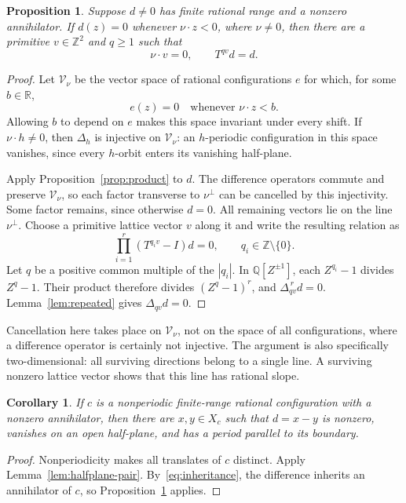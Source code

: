 \documentclass[11pt,a4paper,reqno]{amsart}
\newtheorem{proposition}[theorem]{Proposition}
\newtheorem{corollary}[theorem]{Corollary}
\theoremstyle{remark}
\newcommand{\Z}{\mathbb Z}
\newcommand{\Q}{\mathbb Q}
\newcommand{\R}{\mathbb R}
\newcommand{\De}{\Delta}
\numberwithin{equation}{section}
\begin{document}
\begin{proposition}\label{prop:tangent-period}
Suppose $d\ne0$ has finite rational range and a nonzero annihilator. If $d(z)=0$ whenever $\nu\cdot z<0$, where $\nu\ne0$, then there are a primitive $v\in\Z^2$ and $q\ge1$ such that
\[
 \nu\cdot v=0,\qquad T^{qv}d=d.
\]
\end{proposition}
\begin{proof}
Let $\mathcal V_\nu$ be the vector space of rational configurations $e$ for which, for some $b\in\R$,
\[
 e(z)=0\quad\text{whenever }\nu\cdot z<b.
\]
Allowing $b$ to depend on $e$ makes this space invariant under every shift. If $\nu\cdot h\ne0$, then $\De_h$ is injective on $\mathcal V_\nu$: an $h$-periodic configuration in this space vanishes, since every $h$-orbit enters its vanishing half-plane.

Apply Proposition~\ref{prop:product} to $d$. The difference operators commute and preserve $\mathcal V_\nu$, so each factor transverse to $\nu^\perp$ can be cancelled by this injectivity. Some factor remains, since otherwise $d=0$. All remaining vectors lie on the line $\nu^\perp$. Choose a primitive lattice vector $v$ along it and write the resulting relation as
\[
 \prod_{i=1}^r(T^{q_i v}-I)d=0,
 \qquad q_i\in\Z\setminus\{0\}.
\]
Let $q$ be a positive common multiple of the $|q_i|$. In $\Q[Z^{\pm1}]$, each $Z^{q_i}-1$ divides $Z^q-1$. Their product therefore divides $(Z^q-1)^r$, and $\De_{qv}^{\,r}d=0$. Lemma~\ref{lem:repeated} gives $\De_{qv}d=0$.
\end{proof}

Cancellation here takes place on $\mathcal V_\nu$, not on the space of all configurations, where a difference operator is certainly not injective. The argument is also specifically two-dimensional: all surviving directions belong to a single line. A surviving nonzero lattice vector shows that this line has rational slope.

\begin{corollary}\label{cor:periodic-difference}
If $c$ is a nonperiodic finite-range rational configuration with a nonzero annihilator, then there are $x,y\in X_c$ such that $d=x-y$ is nonzero, vanishes on an open half-plane, and has a period parallel to its boundary.
\end{corollary}
\begin{proof}
Nonperiodicity makes all translates of $c$ distinct. Apply Lemma~\ref{lem:halfplane-pair}. By~\eqref{eq:inheritance}, the difference inherits an annihilator of $c$, so Proposition~\ref{prop:tangent-period} applies.
\end{proof}
\end{document}
